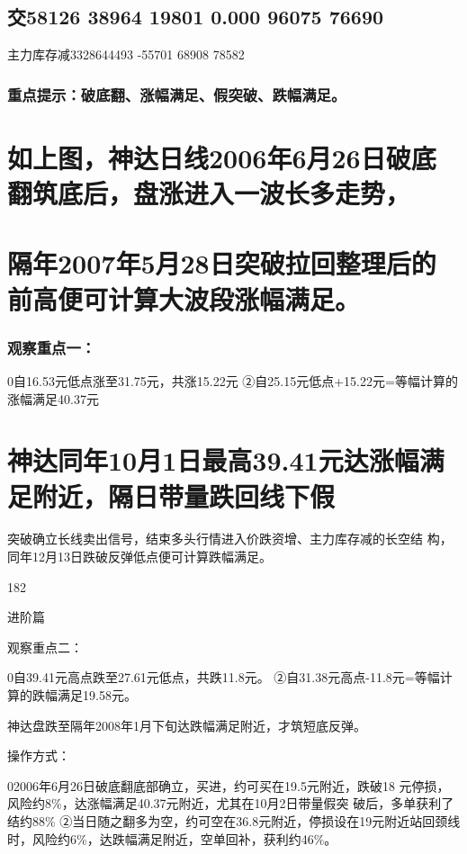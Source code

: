 \documentclass{article}
\begin{document}
\subsection{交58126 38964 19801 0.000 96075 76690}

主力库存减3328644493 -55701 68908 78582

\subsubsection{重点提示：破底翻、涨幅满足、假突破、跌幅满足。}

\section{如上图，神达日线2006年6月26日破底翻筑底后，盘涨进入一波长多走势，}

\section{隔年2007年5月28日突破拉回整理后的前高便可计算大波段涨幅满足。}

\subsubsection{观察重点一：}

0自16.53元低点涨至31.75元，共涨15.22元 ②自25.15元低点+15.22元=等幅计算的涨幅满足40.37元

\section{神达同年10月1日最高39.41元达涨幅满足附近，隔日带量跌回线下假}

突破确立长线卖出信号，结束多头行情进入价跌资增、主力库存减的长空结 构，同年12月13日跌破反弹低点便可计算跌幅满足。

182

\clearpage

进阶篇

观察重点二：

0自39.41元高点跌至27.61元低点，共跌11.8元。 ②自31.38元高点-11.8元=等幅计算的跌幅满足19.58元。

神达盘跌至隔年2008年1月下旬达跌幅满足附近，才筑短底反弹。

操作方式：

02006年6月26日破底翻底部确立，买进，约可买在19.5元附近，跌破18 元停损，风险约8\%，达涨幅满足40.37元附近，尤其在10月2日带量假突 破后，多单获利了结约88\% ②当日随之翻多为空，约可空在36.8元附近，停损设在19元附近站回颈线 时，风险约6\%，达跌幅满足附近，空单回补，获利约46\%。
\end{document}
